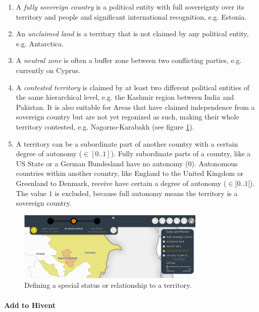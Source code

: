 \begin{enumerate}
  \item A \emph{fully sovereign country} is a political entity with full sovereignty over its territory and people and significant international recognition, e.g. Estonia.
  \item An \emph{unclaimed land} is a territory that is not claimed by any political entity, e.g. Antarctica.
  \item A \emph{neutral zone} is often a buffer zone between two conflicting parties, e.g. currently on Cyprus.
  \item A \emph{contested territory} is claimed by at least two different political entities of the same hierarchical level, e.g. the Kashmir region between India and Pakistan. It is also suitable for Areas that have claimed independence from a sovereign country but are not yet regonized as such, making their whole territory contested, e.g. Nagorno-Karabakh (see figure \ref{fig:uncertainty_new_status_tool}).
  \item A territory can be a subordinate part of another country with a certain degree of autonomy ($\in [0..1]$). Fully subordinate parts of a country, like a US State or a German Bundesland have no autonomy ($0$). Autonomous countries within another country, like England to the United Kingdom or Greenland to Denmark, receive have certain a degree of autonomy ($\in ]0..1[$). The value $1$ is excluded, because full autonomy means the territory is a sovereign country.
\end{enumerate}

\begin{figure}[ht]
  \centering
  \includegraphics[width = 0.8\textwidth]{graphics/extensions/new_status_tool}
  \caption{Defining a special status or relationship to a territory.}
  \label{fig:uncertainty_new_status_tool}
\end{figure}


\paragraph{Add to Hivent} %
\label{par:add_to_hivent}

